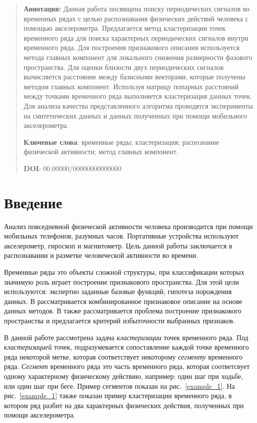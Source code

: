 \documentclass[12pt, twoside]{article}
\begin{document}
{\centering\begin{quote}
\textbf{Аннотация:} Данная работа посвящена поиску периодических сигналов во временных рядах с целью распознавания физических действий человека с помощью акселерометра. Предлагается метод кластеризации точек временного ряда для поиска характерных периодических сигналов внутри временного ряда. Для построения признакового описания используется метода главных компонент для локального снижения размерности фазового пространства. Для оценки близости двух периодических сигналов вычисляется расстояние между базисными векторами, которые получены методом главных компонент. Используя матрицу попарных расстояний между точками временного ряда выполняется кластеризация данных точек. Для анализа качества представленного алгоритма проводятся эксперименты на синтетических данных и данных полученных при помощи мобильного акселерометра.


\smallskip
\textbf{Ключевые слова}: временные ряды; кластеризация; распознание физической активности; метод главных компонент.

\smallskip
\textbf{DOI}: 00.00000/00000000000000
\end{quote}
}

\section{Введение}
Анализ повседневной физической активности человека производится при помощи мобильных телефонов, разумных часов. Портативные устройства используют акселерометр, гироскоп и магнитометр. Цель данной работы заключается в  распознавании и разметке человеческой активности во времени. %

Временные ряды это объекты сложной структуры, при классификации которых значимую роль играет построение признакового пространства. Для этой цели используются: экспертно заданные базовые функций, гипотеза порождения данных. В \cite{Ivkin2015} рассматривается комбинированное признаковое описание на основе данных методов. В \cite{Katrutsa2015} также рассматривается проблема построение признакового пространства и предлагается критерий избыточности выбранных признаков.

В данной работе рассмотрена задача \textit{кластеризации} точек временного ряда. Под \textit{кластеризацией} точек, подразумевается сопоставление каждой точке временного ряда некоторой метке, которая соответствует некоторому \textit{сегменту} временного ряда. \textit{Сегмент} временного ряда это часть временного ряда, которая соответсвует одному характерному физическому действию, например: один шаг при ходьбе, или один шаг при беге. Пример сегментов показан на  рис.~\ref{example_1}. На рис.~\ref{example_1} также показан пример кластеризации временного ряда, в котором ряд разбит на два характерных физических действия, полученных при помощи акселерометра.
\end{document}
